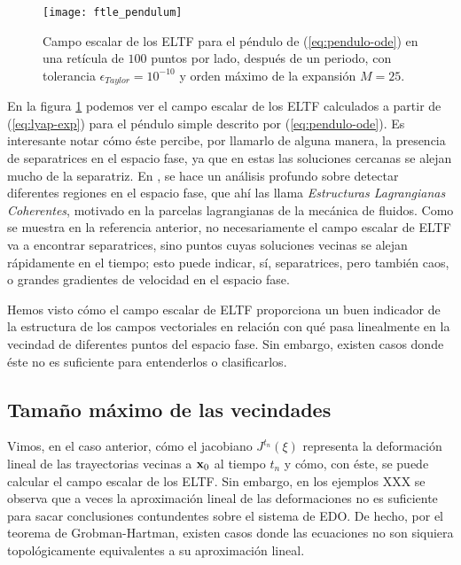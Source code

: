 
\begin{figure}[h!]
 \centering
 \texttt{[image: ftle\_pendulum]}
 \caption{Campo escalar de los ELTF para el péndulo de (\ref{eq:pendulo-ode}) en una retícula de $100$ puntos por lado, después de un periodo, con tolerancia $\epsilon_{Taylor} = 10^{-10}$ y orden máximo de la expansión $M = 25$.}
 \label{fig:ftle_pendulum}
\end{figure}

En la figura \ref{fig:ftle_pendulum} podemos ver el campo escalar de los ELTF calculados a partir de (\ref{eq:lyap-exp}) para el péndulo simple descrito por (\ref{eq:pendulo-ode}). Es interesante notar cómo éste percibe, por llamarlo de alguna manera, la presencia de separatrices en el espacio fase, ya que en estas las soluciones cercanas se alejan mucho de la separatriz. En \cite{Haller2011}, se hace un análisis profundo sobre detectar diferentes regiones en el espacio fase, que ahí las llama \textit{Estructuras Lagrangianas Coherentes}, motivado en la parcelas lagrangianas de la mecánica de fluidos. Como se muestra en la referencia anterior, no necesariamente el campo escalar de ELTF va a encontrar separatrices, sino puntos cuyas soluciones vecinas se alejan rápidamente en el tiempo; esto puede indicar, sí, separatrices, pero también caos, o grandes gradientes de velocidad en el espacio fase.

Hemos visto cómo el campo escalar de ELTF proporciona un buen indicador de la estructura de los campos vectoriales en relación con qué pasa linealmente en la vecindad de diferentes puntos del espacio fase. Sin embargo, existen casos donde éste no es suficiente para entenderlos o clasificarlos. 


\subsection{Tamaño máximo de las vecindades}

Vimos, en el caso anterior, cómo el jacobiano $J^{t_n}(\xi)$ representa la deformación lineal de las trayectorias vecinas a $\mathbf{x}_0$ al tiempo $t_n$ y cómo, con éste, se puede calcular el campo escalar de los ELTF. Sin embargo, en los ejemplos XXX se observa que a veces la aproximación lineal de las deformaciones no es suficiente para sacar conclusiones contundentes sobre el sistema de EDO. De hecho, por el teorema de Grobman-Hartman, existen casos donde las ecuaciones no son siquiera topológicamente equivalentes a su aproximación lineal. 

